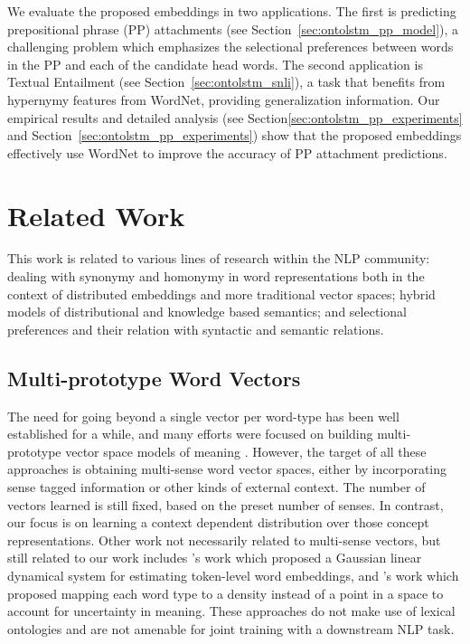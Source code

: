 We evaluate the proposed embeddings in two applications. The first is predicting prepositional phrase 
(PP) attachments (see Section~\ref{sec:ontolstm_pp_model}), a challenging problem which 
emphasizes the selectional preferences between words in the PP and each of the 
candidate head words.  The second application is Textual Entailment (see Section~\ref{sec:ontolstm_snli}),
a task that benefits from hypernymy features from WordNet, providing generalization information.
Our empirical results and detailed analysis (see Section\ref{sec:ontolstm_pp_experiments} and Section~\ref{sec:ontolstm_pp_experiments}) show 
that the proposed embeddings effectively use WordNet to improve the accuracy of 
PP attachment predictions.

\section{Related Work}
\label{sec:ontolstm_related_work}
This work is related to various lines of research within the NLP community: dealing with synonymy and homonymy in word representations both in the context of distributed embeddings and more traditional vector spaces; hybrid models of distributional and knowledge based semantics; and selectional preferences and their relation with syntactic and semantic relations.

\subsection{Multi-prototype Word Vectors}
The need for going beyond a single vector per word-type has been well established for a while, and many efforts were focused on building multi-prototype vector space models of meaning \cite[][etc.]{reisinger2010multi,huang2012improving,chen2014unified,jauhar:15,neelakantan2015efficient,arora2016linear}. However, the target of all these approaches is obtaining multi-sense word vector spaces, either by incorporating sense tagged information or other kinds of external context. The number of vectors learned is still fixed, based on the preset number of senses. In contrast, our focus is on learning a context dependent distribution over those concept representations. Other work not necessarily related to multi-sense vectors, but still related to our work includes \cite{belanger:15}'s work which proposed a Gaussian linear dynamical system for estimating token-level word embeddings, and \cite{Vilnis2014WordRV}'s work which proposed mapping each word type to a density instead of a point in a space to account for uncertainty in meaning. These approaches do not make use of lexical ontologies and are not amenable for joint training with a downstream NLP task. 

